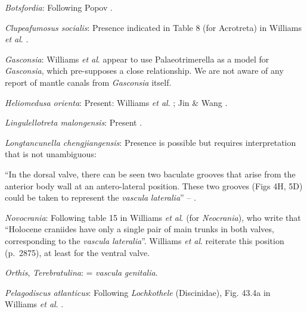 \documentclass[openany]{book}
\theoremstyle{definition}
\theoremstyle{definition}
\theoremstyle{definition}
\theoremstyle{remark}
\begin{document}
\hypertarget{Botsfordia-coding-32}{}
\emph{Botsfordia}: Following Popov \citeyearpar{Popov1992TheCambrian}.

\hypertarget{Clupeafumosus_socialis-coding-32}{}
\emph{Clupeafumosus socialis}: Presence indicated in Table 8 (for
Acrotreta) in Williams \emph{et al}.
\citeyearpar{Williams2000LinguliformeaCraniiformea}.

\hypertarget{Gasconsia-coding-32}{}
\emph{Gasconsia}: Williams \emph{et al}. \citeyearpar[table
15]{Williams2000LinguliformeaCraniiformea} appear to use
Palaeotrimerella \citep[as drawn in][]{Williams1997Introduction} as a
model for \emph{Gasconsia}, which pre-supposes a close relationship. We
are not aware of any report of mantle canals from \emph{Gasconsia}
itself.

\hypertarget{Heliomedusa_orienta-coding-32}{}
\emph{Heliomedusa orienta}: Present: Williams \emph{et al}.
\citeyearpar{Williams2000LinguliformeaCraniiformea}; Jin \& Wang
\citeyearpar{Jin1992Revisionof}.

\hypertarget{Lingulellotreta_malongensis-coding-32}{}
\emph{Lingulellotreta malongensis}: Present
\citep{Williams2000LinguliformeaCraniiformea}.

\hypertarget{Longtancunella_chengjiangensis-coding-32}{}
\emph{Longtancunella chengjiangensis}: Presence is possible but requires
interpretation that is not unambiguous:

``In the dorsal valve, there can be seen two baculate grooves that arise
from the\\
anterior body wall at an antero-lateral position. These two grooves
(Figs 4H, 5D) could be taken to represent the \emph{vascula}
\emph{lateralia}'' -- \citet{Zhang2007Agregarious}.

\hypertarget{Novocrania-coding-32}{}
\emph{Novocrania}: Following table 15 in Williams \emph{et al}.
\citeyearpar{Williams2000LinguliformeaCraniiformea} (for
\emph{Neocrania}), who write that ``Holocene craniides have only a
single pair of main trunks in both valves, corresponding to the
\emph{vascula} \emph{lateralia}''. Williams \emph{et al}.
\citeyearpar{Williams2007Supplement} reiterate this position (p.~2875),
at least for the ventral valve.

\hypertarget{Orthis-coding-32}{}
\emph{Orthis}, \emph{Terebratulina}: = \emph{vascula} \emph{genitalia}.

\hypertarget{Pelagodiscus_atlanticus-coding-32}{}
\emph{Pelagodiscus atlanticus}: Following \emph{Lochkothele}
(Discinidae), Fig. 43.4a in Williams \emph{et al}.
\citeyearpar{Williams2000LinguliformeaCraniiformea}.
\end{document}
